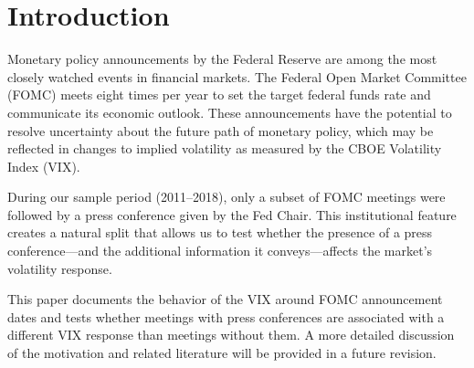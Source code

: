 \section{Introduction}
\label{sec:introduction}

Monetary policy announcements by the Federal Reserve are among the most closely watched events in financial markets. The Federal Open Market Committee (FOMC) meets eight times per year to set the target federal funds rate and communicate its economic outlook. These announcements have the potential to resolve uncertainty about the future path of monetary policy, which may be reflected in changes to implied volatility as measured by the CBOE Volatility Index (VIX).

During our sample period (2011--2018), only a subset of FOMC meetings were followed by a press conference given by the Fed Chair. This institutional feature creates a natural split that allows us to test whether the presence of a press conference---and the additional information it conveys---affects the market's volatility response.

This paper documents the behavior of the VIX around FOMC announcement dates and tests whether meetings with press conferences are associated with a different VIX response than meetings without them. A more detailed discussion of the motivation and related literature will be provided in a future revision.
